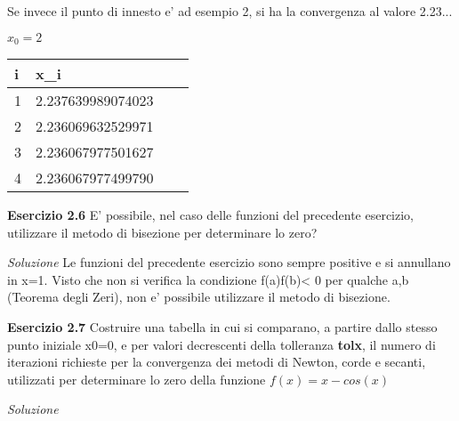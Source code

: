 \documentclass[20pt,a4paper]{book}
\begin{document}
 
\vspace{2mm} 
 
Se invece il punto di innesto e' ad esempio 2, si ha la convergenza al valore 2.23...

\begin{math} x_{0}=2\end{math} \\

\vspace{2mm} 

\begin{tabular}{|l|l|l|l|}
\hline
i & x_{i}\\
\hline
1 & 2.237639989074023 \\
\hline
2 & 2.236069632529971 \\
\hline
3 & 2.236067977501627 \\
\hline
4 & 2.236067977499790 \\
\hline
\end{tabular}


\vspace{10mm}

\textbf{\Large{Esercizio 2.6}} E' possibile, nel caso delle funzioni del precedente esercizio, utilizzare il metodo di bisezione per determinare lo zero?

\textit{Soluzione}
Le funzioni del precedente esercizio sono sempre positive e si annullano in x=1. Visto che non si verifica la condizione f(a)f(b)< 0 per qualche a,b (Teorema degli Zeri), non e' possibile utilizzare il metodo di bisezione.

\vspace{10mm}



\textbf{\Large{Esercizio 2.7}} Costruire una tabella in cui si comparano, a partire dallo stesso punto iniziale x0=0, e per valori decrescenti della tolleranza \textbf{tolx}, il numero di iterazioni richieste per la convergenza dei metodi di Newton, corde e secanti, utilizzati per determinare lo zero della funzione \begin{math}f(x)=x-cos(x) \end{math}

\textit{Soluzione}
\end{document}

